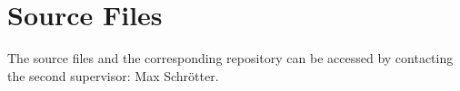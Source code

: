 %
%

\appendix
\pagestyle{appendixstyle}

%
%

\listoffigures


\clearpage

%
%



\chapter{Source Files}
The source files and the corresponding repository can be accessed by contacting the second supervisor: Max Schrötter.

%
%

\printbibliography

\printindex 
